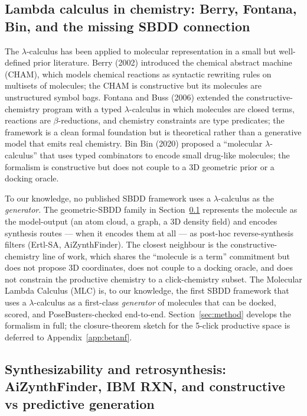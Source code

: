 \subsection{Lambda calculus in chemistry: Berry, Fontana, Bin, and the missing SBDD connection}
\label{sec:related:lambda}

The $\lambda$-calculus has been applied to molecular representation in
a small but well-defined prior literature. Berry (2002)
\cite{footnote:berry2002} introduced the chemical abstract machine
(CHAM), which models chemical reactions as syntactic rewriting rules
on multisets of molecules; the CHAM is constructive but its molecules
are unstructured symbol bags. Fontana and Buss (2006)
\cite{footnote:fontana2006} extended the constructive-chemistry program
with a typed $\lambda$-calculus in which molecules are closed terms,
reactions are $\beta$-reductions, and chemistry constraints are type
predicates; the framework is a clean formal foundation but is
theoretical rather than a generative model that emits real chemistry.
Bin Bin (2020) \cite{footnote:binbin2020} proposed a
``molecular $\lambda$-calculus'' that uses typed combinators to encode
small drug-like molecules; the formalism is constructive but does not
couple to a 3D geometric prior or a docking oracle.

To our knowledge, no published SBDD framework uses a $\lambda$-calculus
as the \emph{generator}. The geometric-SBDD family in
Section~\ref{sec:related:lambda} represents the molecule as the
model-output (an atom cloud, a graph, a 3D density field) and encodes
synthesis routes --- when it encodes them at all --- as post-hoc
reverse-synthesis filters (Ertl-SA, AiZynthFinder). The closest
neighbour is the constructive-chemistry line of work, which shares the
``molecule is a term'' commitment but does not propose 3D
coordinates, does not couple to a docking oracle, and does not
constrain the productive chemistry to a click-chemistry subset. The
Molecular Lambda Calculus (MLC) is, to our knowledge, the first
SBDD framework that uses a $\lambda$-calculus as a first-class
\emph{generator} of molecules that can be docked, scored, and
PoseBusters-checked end-to-end. Section~\ref{sec:method} develops the
formalism in full; the closure-theorem sketch for the 5-click
productive space is deferred to Appendix~\ref{app:betanf}.

\subsection{Synthesizability and retrosynthesis: AiZynthFinder, IBM RXN, and constructive vs predictive generation}
\label{sec:related:retro}

